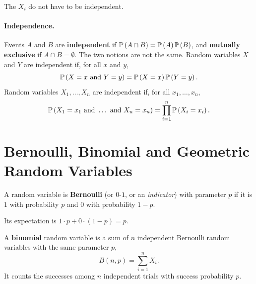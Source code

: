 The $X_i$ do not have to be independent.

\paragraph{Independence.} Events $A$ and $B$ are \textbf{independent} if
$\prob{A \cap B} = \prob{A} \prob{B}$, and \textbf{mutually exclusive} if $A \cap B = \emptyset$.
The two notions are not the same. Random variables $X$ and $Y$ are independent if, for all $x$
and $y$,
\[\prob{X = x \text{ and } Y = y} = \prob{X = x} \prob{Y = y}.\]
Random variables $X_1, \dots, X_n$ are independent if, for all $x_1, \dots, x_n$,
\[\prob{X_1 = x_1 \text{ and } \dots \text{ and } X_n = x_n} = \prod_{i=1}^{n} \prob{X_i = x_i}.\]

\section{Bernoulli, Binomial and Geometric Random Variables}


\begin{definition}\label{def:bernoulli-0827}
    A random variable is \textbf{Bernoulli} (or $0$-$1$, or an \emph{indicator}) with parameter $p$
    if it is $1$ with probability $p$ and $0$ with probability $1 - p$.
\end{definition}

Its expectation is $1 \cdot p + 0 \cdot (1 - p) = p$.

\begin{definition}\label{def:binomial-0827}
    A \textbf{binomial} random variable is a sum of $n$ independent Bernoulli random variables with
    the same parameter $p$,
    \[B(n, p) = \sum_{i=1}^{n} X_i.\]
    It counts the successes among $n$ independent trials with success probability $p$.
\end{definition}

